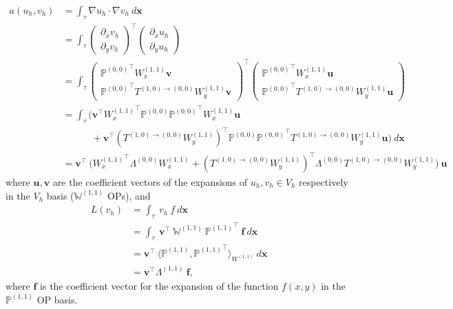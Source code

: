 \documentclass[11pt, oneside]{article}   	%
\newcommand{\Wii}{W^{(1,1)}}
\newcommand{\bigPii}{{\mathbb{P}^{(1,1)}}}
\newcommand{\bigPoo}{{\mathbb{P}^{(0,0)}}}
\newcommand{\element}{\tau}
\newcommand{\bigWii}{{\mathbb{W}^{(1,1)}}}
\begin{document}
\begin{align}
	a(u_h,v_h) &= \int_\element \nabla u_h \cdot \nabla v_h \: d\mathbf{x} \\
	&= \int_\element \begin{pmatrix}
					\partial_x v_h \\
					\partial_y v_h
				\end{pmatrix}^\top 
				\begin{pmatrix}
					\partial_x u_h \\
					\partial_y u_h
				\end{pmatrix}
				\\
	&= \int_\element \begin{pmatrix}
					\bigPoo^\top \Wii_x \mathbf{v} \\
					\bigPoo^\top T^{(1,0)\to(0,0)} \Wii_y \mathbf{v}
				\end{pmatrix}^\top 
				\begin{pmatrix}
					\bigPoo^\top \Wii_x \mathbf{u} \\
					\bigPoo^\top T^{(1,0)\to(0,0)} \Wii_y \mathbf{u}
				\end{pmatrix}
				\\
	&= \int_\element \Big( \mathbf{v}^\top {\Wii_x}^\top \bigPoo \bigPoo^\top \Wii_x \mathbf{u} \nonumber \\
					& \quad \quad \quad + \mathbf{v}^\top ({T^{(1,0)\to(0,0)} \Wii_y})^\top \bigPoo \bigPoo^\top T^{(1,0)\to(0,0)} \Wii_y \mathbf{u}  \Big) \: d\mathbf{x} \\
	&= \mathbf{v}^\top \: \Big( {\Wii_x}^\top \Lambda^{(0,0)} \Wii_x + ({T^{(1,0)\to(0,0)} \Wii_y})^\top \Lambda^{(0,0)} T^{(1,0)\to(0,0)} \Wii_y \Big) \: \mathbf{u}
\end{align}
where $\mathbf{u}, \mathbf{v}$ are the coefficient vectors of the expansions of $u_h, v_h \in V_h$ respectively in the $V_h$ basis ($\bigWii$ OPs), and
\begin{align}
	L(v_h) &= \int_\element \: v_h \: f \: d\mathbf{x} \\
	&= \int_\element \: \mathbf{v}^\top \: \bigWii \: \bigPii^\top \: \mathbf{f} \: d\mathbf{x} \\
	&= \mathbf{v}^\top \: \langle \bigPii, {\bigPii}^\top \rangle_{\Wii} \: d\mathbf{x} \\
	&= \mathbf{v}^\top \Lambda^{(1,1)} \: \mathbf{f},
\end{align}
where $\mathbf{f}$ is the coefficient vector for the expansion of the function $f(x,y)$ in the $\bigPii$ OP basis.
\end{document}
